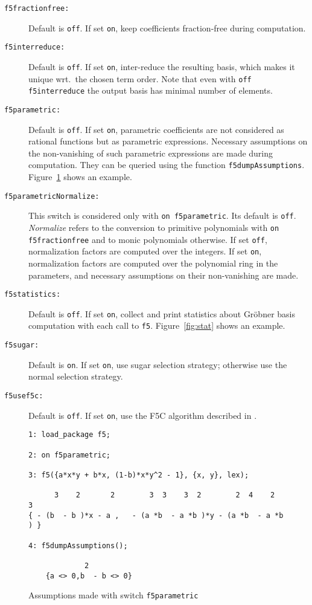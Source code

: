 \documentclass{article}
\newcommand{\grobner}{Gr\"obner}
\newcommand{\code}[1]{\texttt{#1}}
\begin{document}
\begin{description}
\item[\code{f5fractionfree:}] Default is \code{off}. If set \code{on}, keep
coefficients fraction-free during computation.
%
\item[\code{f5interreduce:}] Default is \code{off}.
If set \code{on}, inter-reduce the resulting basis, which makes it unique
wrt.~the chosen term order. Note that even with
\code{off f5interreduce} the output basis has minimal number of elements.
%
\item[\code{f5parametric:}] Default is \code{off}. If set \code{on}, parametric coefficients are not
considered as rational functions but as parametric expressions. Necessary assumptions on the
non-vanishing of such parametric expressions are made during computation. They can be queried using
the function \code{f5dumpAs\-sump\-tions}. Figure~\ref{fig:para} shows an example.
%
\item[\code{f5parametricNormalize:}] This switch is considered only with \code{on f5para\-met\-ric}.
Its default is \code{off}. \emph{Normalize} refers to the conversion to primitive polynomials with
\code{on f5fractionfree} and to monic polynomials otherwise. If set \code{off}, normalization
factors are computed over the integers. If set \code{on}, normalization factors are computed over
the polynomial ring in the parameters, and necessary assumptions on their non-vanishing are made.
%
\item[\code{f5statistics:}] Default is
\code{off}. If set \code{on}, collect and print statistics about \grobner{}
basis computation with each call to \code{f5}. Figure~\ref{fig:stat} shows an example.
%
\item[\code{f5sugar:}]  Default is \code{on}. If set \code{on}, use sugar selection strategy;
otherwise use the normal selection strategy.
%
\item[\code{f5usef5c:}] Default is \code{off}. If set \code{on}, use the F5C algorithm described in
\cite{f5c}.
\end{description}
%
\begin{figure}[p]
\footnotesize
\begin{verbatim}
1: load_package f5;

2: on f5parametric;

3: f5({a*x*y + b*x, (1-b)*x*y^2 - 1}, {x, y}, lex);

      3    2       2        3  3    3  2        2  4    2  3
{ - (b  - b )*x - a ,   - (a *b  - a *b )*y - (a *b  - a *b ) }

4: f5dumpAssumptions();

             2
    {a <> 0,b  - b <> 0}
\end{verbatim}
\caption{Assumptions made with switch \code{f5parametric}\label{fig:para}}
\end{figure}
\end{document}
